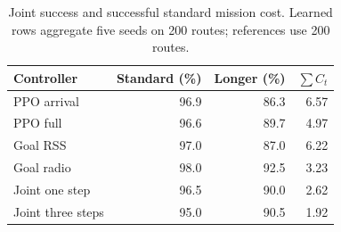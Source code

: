 \begin{table}[!t]\centering
\caption{Joint success and successful standard mission cost. Learned rows aggregate five seeds on 200 routes; references use 200 routes.}
\label{tab:jointresults}
\begin{tabular}{lrrr}\toprule
Controller & Standard (\%) & Longer (\%) & $\sum C_t$\\\midrule
PPO arrival & 96.9 & 86.3 & 6.57\\
PPO full & 96.6 & 89.7 & 4.97\\
Goal RSS & 97.0 & 87.0 & 6.22\\
Goal radio & 98.0 & 92.5 & 3.23\\
Joint one step & 96.5 & 90.0 & 2.62\\
Joint three steps & 95.0 & 90.5 & 1.92\\
\bottomrule\end{tabular}
\end{table}
